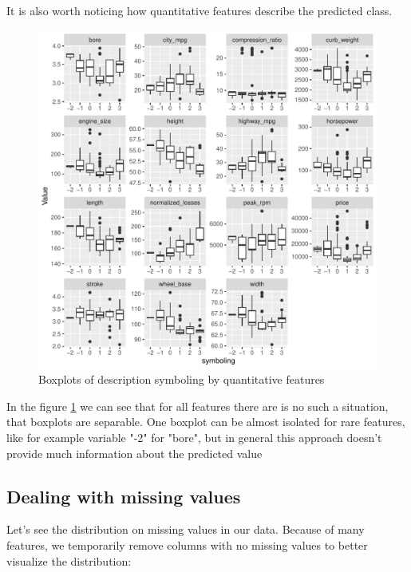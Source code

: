 \documentclass[11pt,a4paper]{article}\usepackage[]{graphicx}\usepackage[]{xcolor}
\makeatletter
\def\maxwidth{ %
  \ifdim\Gin@nat@width>\linewidth
    \linewidth
  \else
    \Gin@nat@width
  \fi
}
\newenvironment{knitrout}{}{} %
\makeatother
\begin{document}
	It is also worth noticing how quantitative features describe the predicted class.
\begin{knitrout}
\color{fgcolor}\begin{figure}
\includegraphics[width=\maxwidth]{figure/quantitative_symboling-1} \caption[Boxplots of description symboling by quantitative features]{Boxplots of description symboling by quantitative features}\label{fig:quantitative_symboling}
\end{figure}

\end{knitrout}
	
	In the figure \ref{fig:quantitative_symboling} we can see that for all features there are is no such a situation, that boxplots are separable. One boxplot can be almost isolated for rare features, like for example variable "-2" for "bore", but in general this approach doesn't provide much information about the predicted value
	
	\subsection{Dealing with missing values}
	
	Let's see the distribution on missing values in our data. Because of many features, we temporarily remove columns with no missing values to better visualize the distribution:
	
\end{document}
